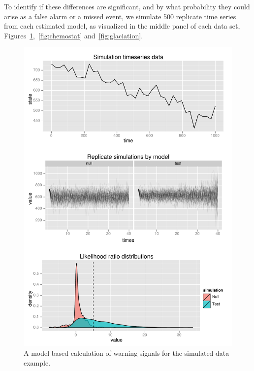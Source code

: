 \documentclass[authoryear,review,11pt]{elsarticle}
\begin{document}
To identify if these differences are significant,
and by what probability they could arise as a false alarm or a missed event,
we simulate 500 replicate time series from each estimated model,
as visualized in the middle panel of each data set,
Figures~\ref{fig:simulation},~\ref{fig:chemostat} and~\ref{fig:glaciation}. 

 \begin{figure}
   \begin{center}
     \includegraphics[width=.85\linewidth]{figures/Simulation_warningsignal.pdf}
     \caption{A model-based calculation of warning signals for the simulated data example.}
     \label{fig:simulation}
  \end{center}
 \end{figure}
\end{document}
